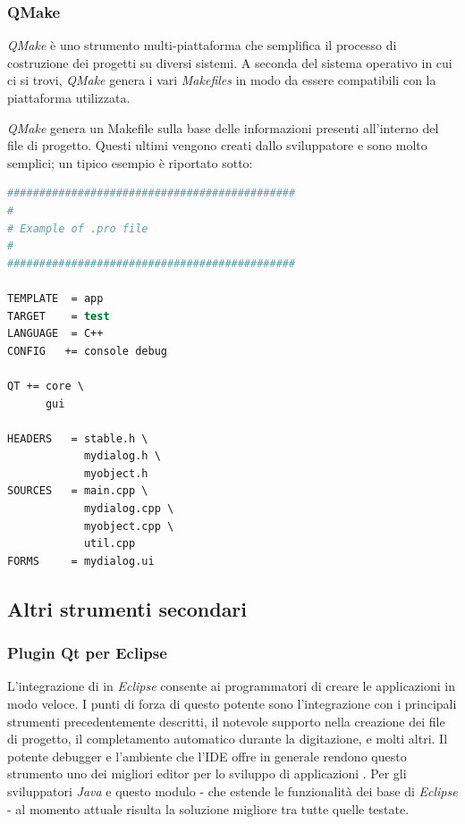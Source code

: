 \subsubsection{QMake}
\emph{QMake} è uno strumento multi-piattaforma che semplifica il processo di costruzione dei progetti \qt{} su diversi sistemi. A seconda del sistema operativo in cui ci si trovi, \emph{QMake} genera i vari  \emph{Makefiles} in modo da essere compatibili con la piattaforma utilizzata.

\emph{QMake} genera un Makefile sulla base delle informazioni presenti all'interno del file di progetto. Questi ultimi vengono creati dallo sviluppatore e sono molto semplici; un tipico esempio è riportato sotto:

\begin{lstlisting}[language=csh]
#############################################
#
# Example of .pro file
#
#############################################

TEMPLATE  = app
TARGET    = test
LANGUAGE  = C++
CONFIG   += console debug

QT += core \
      gui

HEADERS   = stable.h \
            mydialog.h \
            myobject.h
SOURCES   = main.cpp \
            mydialog.cpp \
            myobject.cpp \
            util.cpp
FORMS     = mydialog.ui
\end{lstlisting}

\subsection{Altri strumenti secondari}

\subsubsection{Plugin Qt per Eclipse}
L'integrazione di \qt{} in \emph{Eclipse} consente ai programmatori di creare le applicazioni in modo veloce. I punti di forza di questo potente \plugin{} sono l'integrazione con i principali strumenti \qt{} precedentemente descritti, il notevole supporto nella creazione dei file di progetto, il completamento automatico durante la digitazione, e molti altri. Il potente debugger e l'ambiente che l'IDE offre in generale rendono questo strumento uno dei migliori editor per lo sviluppo di applicazioni \qt{}.
Per gli sviluppatori \emph{Java} e \cpp{} questo modulo - che estende le funzionalità dei \plugin{} base di \emph{Eclipse} - al momento attuale risulta la soluzione migliore tra tutte quelle testate.

